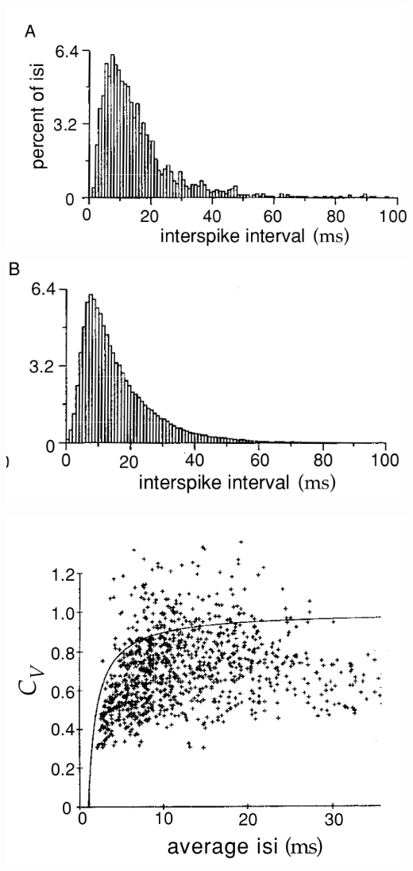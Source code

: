 \begin{center}
    \label{fig:1.15A}    
    \includegraphics[scale = 0.2]{png/Figure1-15-A.png}\\
\end{center}

\begin{center}
    \label{fig:1.15B}    
    \includegraphics[scale = 0.2]{png/Figure1-15-B.png}\\
\end{center}

\begin{center}
    \label{fig:1.16}    
    \includegraphics[scale = 0.2]{png/Figure1-16.png}\\
\end{center}







